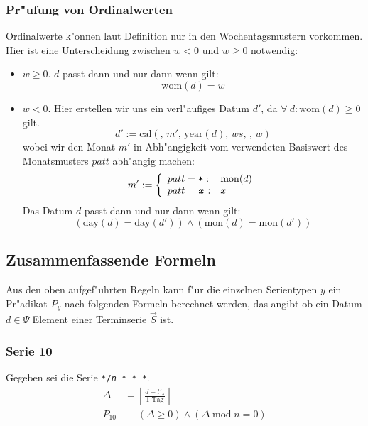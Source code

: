 \documentclass[a4paper]{article}
\newcommand*{\dayf}{\mathrm{day}}
\newcommand*{\monf}{\mathrm{mon}}
\newcommand*{\yearf}{\mathrm{year}}
\newcommand*{\womf}{\mathrm{wom}}
\newcommand*{\calf}{\mathrm{cal}}
\renewcommand{\mod}{\;\mathrm{mod}\;}
\numberwithin{equation}{section}
\begin{document}
\subsubsection{Pr"ufung von Ordinalwerten}
Ordinalwerte k"onnen laut Definition nur in den Wochentagsmustern vorkommen.
Hier ist eine Unterscheidung zwischen $w < 0$ und $w \ge 0$ notwendig:
\begin{itemize}
\item $w \ge 0$. $d$ passt dann und nur dann wenn gilt:
  \begin{equation}\womf(d) = w\end{equation}
\item $w < 0$. Hier erstellen wir uns ein verl"aufiges Datum $d'$,
  da $\forall\ d: \womf(d) \ge 0$ gilt.
  \begin{equation}d' := \calf(,\,m',\,\yearf(d),\,ws,\,,\,w)\end{equation}
  wobei wir den Monat $m'$ in Abh"angigkeit vom verwendeten Basiswert des
  Monatsmusters $patt$ abh"angig machen:
  \begin{equation}
  m' := \left\{\begin{array}{ll}
  patt = \texttt{*} : & \monf(d) \\
  patt = \texttt{\textit{x}} : & x \\
  \end{array}\right.
  \end{equation}
  Das Datum $d$ passt dann und nur dann wenn gilt:
  \begin{equation}
    (\dayf(d) = \dayf(d')) \wedge (\monf(d) = \monf(d'))
  \end{equation}
\end{itemize}


%
%
\subsection{Zusammenfassende Formeln}\label{ssec:dateInSeries}
Aus den oben aufgef"uhrten Regeln kann f"ur die einzelnen Serientypen $y$ ein
Pr"adikat $P_y$ nach folgenden Formeln berechnet werden, das angibt ob ein Datum
$d \in \Psi$ Element einer Terminserie $\vec{S}$ ist.

\subsubsection{Serie 10}
Gegeben sei die Serie \texttt{*/\textit{n} * * *}.
\begin{equation}
\begin{split}
  \Delta & = \left\lfloor\frac{d - t'_s}{1 \textrm{ Tag}}\right\rfloor \\
  P_{10} & \equiv (\Delta \ge 0) \wedge (\Delta \mod n = 0)
\end{split}
\end{equation}
\end{document}
